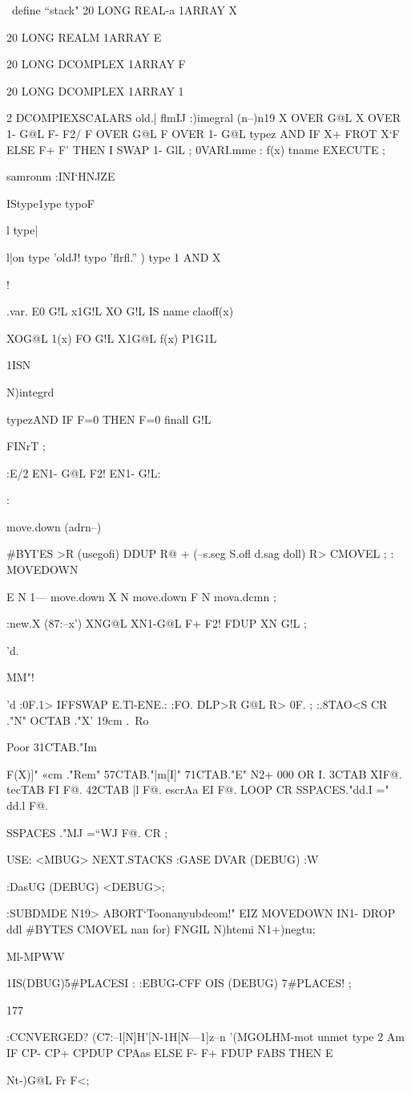 \ deﬁne “stack"
20 LONG REAL-a 1ARRAY X{
20 LONG REALM 1ARRAY E{
20 LONG DCOMPLEX 1ARRAY F{
20 LONG DCOMPLEX 1ARRAY 1{

2 DCOMPIEXSCALARS old.| ﬂmIJ
:)imegral (n--)\trapezoidal n19
X{ OVER } G@L
X{ OVER 1- } G@L
F- F2/
F{ OVER } G@L
F{ OVER 1-} G@L
typez AND
IF X+ FROT X‘F
ELSE F+ F' THEN
I{ SWAP 1- } GlL ;
0VARI.mme
: f(x) tname EXECUTE ;

 

samronm
:INI‘HNJZE

IStype\m1ype
typoF{l
type|{ l\oettypesforfma|on
type 'oldJ!
typo 'ﬂrﬂ.” )
type 1 AND X{!

\Satypeforhdep.var.
E{0} G!L \storeenot
x{1}G!L \storeB
X{O} G!L \sloraA
IS name \!claoff(x)

X{O}G@L 1(x) F{O} G!L
X{1}G@L f(x) P{1}G1L

1ISN

N)integrd

typezAND IF F=0 THEN
F=0 ﬁnall G!L

FINrT ;

:E/2 E{N1-} G@L F2! E{N1-} G!L:

:}move.down (adrn--)

} #BYI'ES >R (usegoﬁ)
DDUP R@ +
(--s.seg S.oﬂ d.sag doll)
R> CMOVEL ;
: MOVEDOWN

E{ N 1— }move.down
X{ N }move.down
F{ N }mova.dcmn ;

:new.X (87:--x')
X{N}G@L X{N1-}G@L
F+ F2! FDUP X{N} G!L ;

\Conl’d.

MM"!

'd
\mm
:0F.1> IFFSWAP E.Tl-ENE.:
:FO. DLP>R G@L R> 0F. ;
:.8TAO<S CR ."N"
OCTAB ."X'
19cm .~Ro{Poor
31CTAB."Im{F(X)]"
«cm ."Rem"
57CTAB."|m[I]"
71CTAB."E"
N2+ 000 OR I.
3CTAB X{I}F@.
tecTAB F{I} F@.
42CTAB |{l} F@.
escrAa E{I} F@.
LOOP
CR SSPACES."dd.I =" dd.l F@.

SSPACES ."MJ =“WJ F@. CR ;

USE: <MBUG> NEXT.STACKS :GASE
DVAR (DEBUG)
:W

:DasUG (DEBUG) <DEBUG>;

:SUBDMDE
N19> ABORT‘Toonanyubdeom!"
EIZ MOVEDOWN
I{N1-} DROP ddl #BYTES CMOVEL
nan for) F{N}GIL
N)htemi N1+)negtu;

Ml-MPWW

1IS(DBUG)5#PLACESI :
:EBUG-CFF OIS (DEBUG) 7#PLACES! ;

 

177

:CCNVERGED? (C7:--l[N]H'[N-1H[N—1]z--n
'(MGOLHM-mot unmet
type 2 Am
IF CP- CP+ CPDUP CPAas
ELSE F- F+ FDUP FABS
THEN
E{Nt-)G@L Fr F<;

}}}}}}}}
